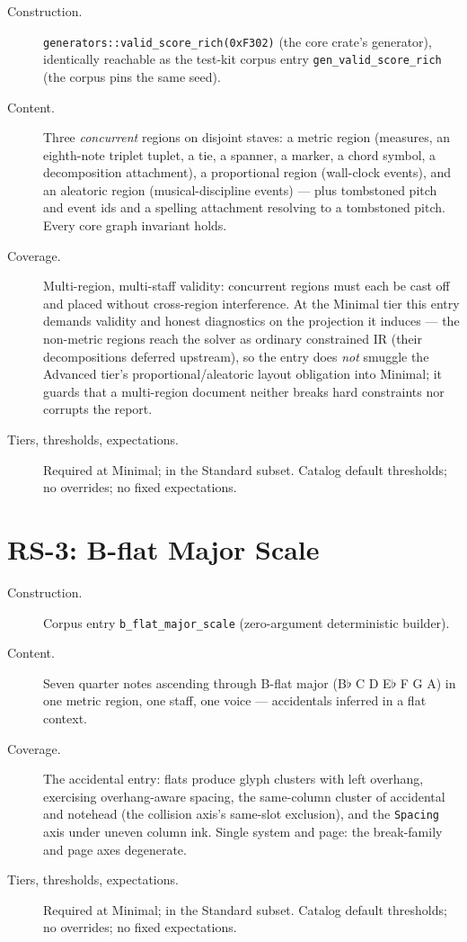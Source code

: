 \documentclass[11pt,letterpaper]{report}
\begin{document}
\begin{description}
  \item[Construction.]
    \texttt{generators::valid\_score\_rich(0xF302)} (the core crate's
    generator), identically reachable as the test-kit corpus entry
    \texttt{gen\_valid\_score\_rich} (the corpus pins the same seed).
  \item[Content.] Three \emph{concurrent} regions on disjoint staves: a
    metric region (measures, an eighth-note triplet tuplet, a tie, a
    spanner, a marker, a chord symbol, a decomposition attachment), a
    proportional region (wall-clock events), and an aleatoric region
    (musical-discipline events) --- plus tombstoned pitch and event ids
    and a spelling attachment resolving to a tombstoned pitch. Every
    core graph invariant holds.
  \item[Coverage.] Multi-region, multi-staff validity: concurrent
    regions must each be cast off and placed without cross-region
    interference. At the Minimal tier this entry demands validity and
    honest diagnostics on the projection it induces --- the non-metric
    regions reach the solver as ordinary constrained IR (their
    decompositions deferred upstream), so the entry does \emph{not}
    smuggle the Advanced tier's proportional/aleatoric layout obligation
    into Minimal; it guards that a multi-region document neither breaks
    hard constraints nor corrupts the report.
  \item[Tiers, thresholds, expectations.] Required at Minimal; in the
    Standard subset. Catalog default thresholds; no overrides; no fixed
    expectations.
\end{description}

\section{RS-3: B-flat Major Scale}
\label{sec:entries:rs3}

\begin{description}
  \item[Construction.] Corpus entry \texttt{b\_flat\_major\_scale}
    (zero-argument deterministic builder).
  \item[Content.] Seven quarter notes ascending through B-flat major
    (B$\flat$ C D E$\flat$ F G A) in one metric region, one staff, one
    voice --- accidentals inferred in a flat context.
  \item[Coverage.] The accidental entry: flats produce glyph clusters
    with left overhang, exercising overhang-aware spacing, the same-column
    cluster of accidental and notehead (the collision axis's same-slot
    exclusion), and the \texttt{Spacing} axis under uneven column
    ink. Single system and page: the break-family and page axes
    degenerate.
  \item[Tiers, thresholds, expectations.] Required at Minimal; in the
    Standard subset. Catalog default thresholds; no overrides; no fixed
    expectations.
\end{description}
\end{document}
